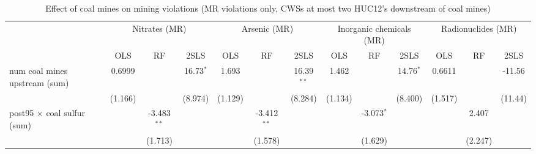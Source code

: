 
\begin{table}[htbp]
   
   \caption{\label{2sls_dwnstrm2step_minevio_mr_ivsum} Effect of coal mines on mining violations (MR violations only, CWSs at most two HUC12's downstream of coal mines)}
   \bigskip
   
   \centering
   
   \begin{adjustbox}{width = \textwidth, center}
      
      
      \begin{tabular}{lcccccccccccc}
         \toprule
         
          & \multicolumn{3}{c}{Nitrates (MR)} & \multicolumn{3}{c}{Arsenic (MR)} & \multicolumn{3}{c}{Inorganic chemicals (MR)} & \multicolumn{3}{c}{Radionuclides (MR)}\\
         
                                                                            & OLS           & RF            & 2SLS          & OLS           & RF            & 2SLS          & OLS           & RF            & 2SLS          & OLS           & RF            & 2SLS\\  
         
         \midrule 
         num coal mines upstream (sum)                                      & 0.6999        &               & 16.73$^{*}$   & 1.693         &               & 16.39$^{**}$  & 1.462         &               & 14.76$^{*}$   & 0.6611        &               & -11.56\\   
                                                                            & (1.166)       &               & (8.974)       & (1.129)       &               & (8.284)       & (1.134)       &               & (8.400)       & (1.517)       &               & (11.44)\\   
         post95 $\times$ coal sulfur (sum)                                  &               & -3.483$^{**}$ &               &               & -3.412$^{**}$ &               &               & -3.073$^{*}$  &               &               & 2.407         &   \\   
                                                                            &               & (1.713)       &               &               & (1.578)       &               &               & (1.629)       &               &               & (2.247)       &   \\   
         

\end{tabular}
\end{adjustbox}
\end{table}

